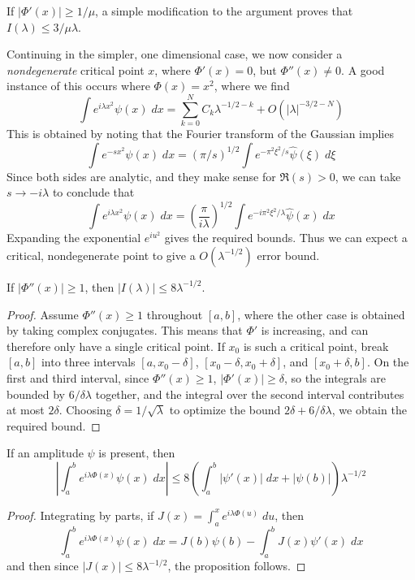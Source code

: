 \begin{remark}
	If $|\Phi'(x)| \geq 1/\mu$, a simple modification to the argument proves that $I(\lambda) \leq 3/\mu \lambda$.
\end{remark}

Continuing in the simpler, one dimensional case, we now consider a {\it nondegenerate} critical point $x$, where $\Phi'(x) = 0$, but $\Phi''(x) \neq 0$. A good instance of this occurs where $\Phi(x) = x^2$, where we find
%
\[ \int e^{i \lambda x^2} \psi(x)\; dx = \sum_{k = 0}^N C_k \lambda^{-1/2-k} + O(|\lambda|^{-3/2-N}) \]
%
This is obtained by noting that the Fourier transform of the Gaussian implies
%
\[ \int e^{- sx^2} \psi(x)\; dx = (\pi/s)^{1/2} \int e^{- \pi^2 \xi^2/ s} \widehat{\psi}(\xi)\; d\xi \]
%
Since both sides are analytic, and they make sense for $\Re(s) > 0$, we can take $s \to -i\lambda$ to conclude that
%
\[ \int e^{i \lambda x^2} \psi(x)\; dx = \left( \frac{\pi}{i \lambda} \right)^{1/2} \int e^{-i\pi^2 \xi^2/\lambda} \widehat{\psi}(x)\; dx \]
%
Expanding the exponential $e^{i u^2}$ gives the required bounds. Thus we can expect a critical, nondegenerate point to give a $O(\lambda^{-1/2})$ error bound.

\begin{theorem}
	If $|\Phi''(x)| \geq 1$, then $|I(\lambda)| \leq 8\lambda^{-1/2}$.
\end{theorem}
\begin{proof}
	Assume $\Phi''(x) \geq 1$ throughout $[a,b]$, where the other case is obtained by taking complex conjugates. This means that $\Phi'$ is increasing, and can therefore only have a single critical point. If $x_0$ is such a critical point, break $[a,b]$ into three intervals $[a,x_0 - \delta]$, $[x_0-\delta,x_0 + \delta]$, and $[x_0 + \delta, b]$. On the first and third interval, since $\Phi''(x) \geq 1$, $|\Phi'(x)| \geq \delta$, so the integrals are bounded by $6/\delta \lambda$ together, and the integral over the second interval contributes at most $2 \delta$. Choosing $\delta = 1/\sqrt{\lambda}$ to optimize the bound $2\delta + 6/\delta \lambda$, we obtain the required bound.
\end{proof}

\begin{corollary}
	If an amplitude $\psi$ is present, then
	\[ \left| \int_a^b e^{i \lambda \Phi(x)} \psi(x)\; dx \right| \leq 8 \left( \int_a^b |\psi'(x)|\; dx + |\psi(b)| \right) \lambda^{-1/2} \]
\end{corollary}
\begin{proof}
	Integrating by parts, if $J(x) = \int_a^x e^{i \lambda \Phi(u)}\; du$, then
	\[ \int_a^b e^{i \lambda \Phi(x)} \psi(x)\; dx = J(b)\psi(b) - \int_a^b J(x) \psi'(x)\; dx \]
	and then since $|J(x)| \leq 8\lambda^{-1/2}$, the proposition follows.
\end{proof}

